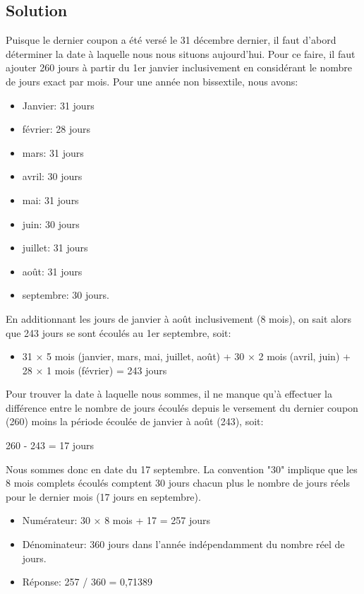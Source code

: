 \documentclass[10pt,a4paper]{article}
\begin{document}
\subsection*{Solution}
Puisque le dernier coupon a été versé le 31 décembre dernier, il faut d'abord déterminer la date à laquelle nous nous situons aujourd'hui. Pour ce faire, il faut ajouter 260 jours à partir du 1er janvier inclusivement en considérant le nombre de jours exact par mois. Pour une année non bissextile, nous avons:
\begin{itemize}
\item Janvier: 31 jours
\item février: 28 jours 
\item mars: 31 jours
\item avril: 30 jours
\item mai: 31 jours
\item juin: 30 jours
\item juillet: 31 jours 
\item août: 31 jours
\item septembre: 30 jours.
\end{itemize}

En additionnant les jours de janvier à août inclusivement (8 mois),  on sait alors que 243 jours se sont écoulés au 1er septembre, soit:
\begin{itemize}
\item 31 × 5 mois (janvier, mars, mai, juillet, août) + 30 × 2 mois (avril, juin) + 28 × 1 mois (février) = 243 jours
\end{itemize}

Pour trouver la date à laquelle nous sommes, il ne manque qu'à effectuer la différence entre le nombre de jours écoulés depuis le versement du dernier coupon (260) moins la période écoulée de janvier à août (243), soit:
\begin{center}
260 - 243 = 17 jours
\end{center}

Nous sommes donc en date du 17 septembre. La convention "30" implique que les 8 mois complets écoulés comptent 30 jours chacun plus le nombre de jours réels pour le dernier mois (17 jours en septembre).
\begin{itemize}
\item Numérateur: 30 × 8 mois + 17 = 257 jours
\item Dénominateur: 360 jours dans l'année indépendamment du nombre réel de jours.
\item Réponse: 257 / 360 = 0,71389
\end{itemize}
\end{document}
